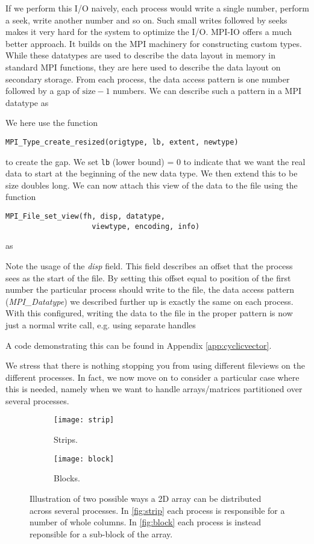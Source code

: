 If we perform this I/O naively, each process would write a single number,
perform a seek, write another number and so on. Such small writes followed by
seeks makes it very hard for the system to optimize the I/O. MPI-IO offers a
much better approach. It builds on the MPI machinery for constructing custom
types. While these datatypes are used to describe the data layout in memory in
standard MPI functions, they are here used to describe the data layout on
secondary storage. From each process, the data access pattern is one number
followed by a gap of $\text{size}-1$ numbers. We can describe such a pattern in
a MPI datatype as

We here use the function
\begin{lstlisting}[style=c]
  MPI_Type_create_resized(origtype, lb, extent, newtype)
\end{lstlisting}
to create the gap. We set \texttt{lb} (lower bound) = 0 to indicate that we want
the real data to start at the beginning of the new data type. We then extend
this to be size doubles long. We can now attach this view of the data to the
file using the function
\begin{lstlisting}[style=c]
  MPI_File_set_view(fh, disp, datatype,
                    viewtype, encoding, info)
\end{lstlisting}
as

Note the usage of the \emph{disp} field. This field describes an offset that the
process sees as the start of the file. By setting this offset equal to position
of the first number the particular process should write to the file, the
data access pattern (\emph{MPI\_Datatype}) we described further up is exactly
the same on each process. With this configured, writing the data to the file in
the proper pattern is now just a normal write call, e.g. using separate handles

A code demonstrating this can be found in Appendix \ref{app:cyclicvector}.

We stress that there is nothing stopping you from using different fileviews on
the different processes. In fact, we now move on to consider a particular case
where this is needed, namely when we want to handle arrays/matrices partitioned
over several processes.

\begin{figure}
  \begin{subfigure}{6cm}
    \texttt{[image: strip]}
    \caption{Strips.}
    \label{fig:strip}
  \end{subfigure}
  \begin{subfigure}{6cm}
    \texttt{[image: block]}
    \caption{Blocks.}
    \label{fig:block}
  \end{subfigure}
  \caption{
    Illustration of two possible ways a 2D array can be distributed across
    several processes. In \autoref{fig:strip} each process is responsible for a
    number of whole columns. In \autoref{fig:block} each process is instead
    reponsible for a sub-block of the array.
  }
  \label{fig:darrays}
\end{figure}

